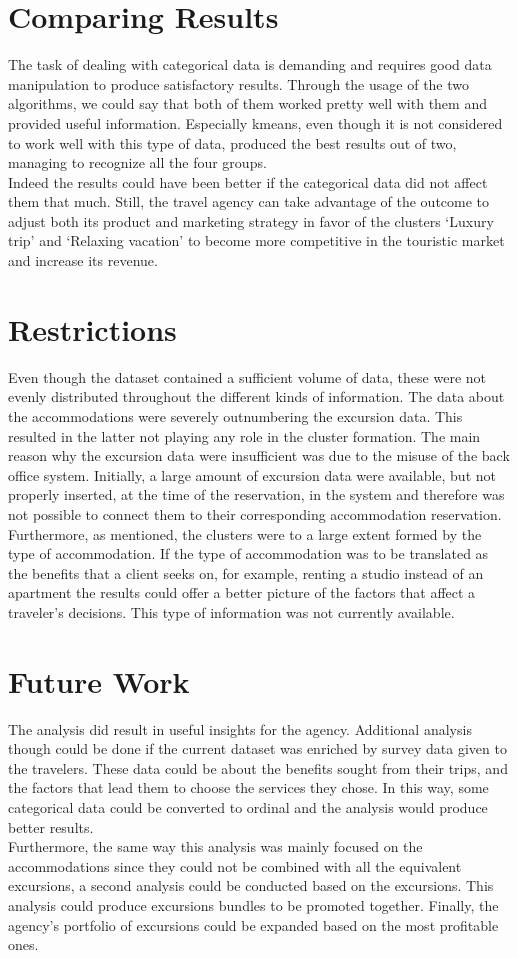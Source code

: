 \section{Comparing Results}
The task of dealing with categorical data is demanding and requires good data manipulation to produce satisfactory results. Through the usage of the two algorithms, we could say that both of them worked pretty well with them and provided useful information. Especially kmeans, even though it is not considered to work well with this type of data, produced the best results out of two, managing to recognize all the four groups. \\
Indeed the results could have been better if the categorical data did not affect them that much. Still, the travel agency can take advantage of the outcome to adjust both its product and marketing strategy in favor of the clusters `Luxury trip' and `Relaxing vacation' to become more competitive in the touristic market and increase its revenue.
\section{Restrictions}
Even though the dataset contained a sufficient volume of data, these were not evenly distributed throughout the different kinds of information. The data about the accommodations were severely outnumbering the excursion data. This resulted in the latter not playing any role in the cluster formation. The main reason why the excursion data were insufficient was due to the misuse of the back office system. Initially, a large amount of excursion data were available, but not properly inserted, at the time of the reservation, in the system and therefore was not possible to connect them to their corresponding accommodation reservation. \\
Furthermore, as mentioned, the clusters were to a large extent formed by the type of accommodation. If the type of accommodation was to be translated as the benefits that a client seeks on, for example, renting a studio instead of an apartment the results could offer a better picture of the factors that affect a traveler's decisions. This type of information was not currently available.
\section{Future Work}
The analysis did result in useful insights for the agency. Additional analysis though could be done if the current dataset was enriched by survey data given to the travelers. These data could be about the benefits sought from their trips, and the factors that lead them to choose the services they chose. In this way, some categorical data could be converted to ordinal and the analysis would produce better results. \\
Furthermore, the same way this analysis was mainly focused on the accommodations since they could not be combined with all the equivalent excursions, a second analysis could be conducted based on the excursions. This analysis could produce excursions bundles to be promoted together. Finally, the agency's portfolio of excursions could be expanded based on the most profitable ones.